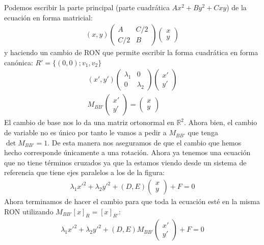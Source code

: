 \documentclass[14pt]{book}
\begin{document}
Podemos escribir la parte principal (parte cuadrática $Ax^2 + By^2 + Cxy$) de la ecuación en forma matricial:
\begin{align*}
	(x, y)\left(\begin{array}{cc}
	A & C/2 \\ C/2 &B
	\end{array}\right)\left(\begin{array}{c}
	x \\ y
	\end{array}\right)
\end{align*}
y haciendo un cambio de RON que permite escribir la forma cuadrática en forma canónica: $R' = \{(0,0); v_1, v_2\}$
\begin{align*}
	(x', y')\left(\begin{array}{cc}
	\lambda_1 & 0 \\ 0 & \lambda_2
	\end{array}\right)\left(\begin{array}{c}
	x' \\ y'
	\end{array}\right) \\
	M_{BB'}\left(\begin{array}{c}
	x' \\ y'
	\end{array}\right) = \left(\begin{array}{c}
	x \\ y
	\end{array}\right)
\end{align*}
El cambio de base nos lo da una matriz ortonormal en $\mathbb{R}^2$. Ahora bien, el cambio de variable no es único por tanto le vamos a pedir a $M_{BB'}$ que tenga $\det M_{BB'} = 1$. De esta manera nos aseguramos de que el cambio que hemos hecho corresponde únicamente a una rotación. Ahora ya tenemos una ecuación que no tiene términos cruzados ya que la estamos viendo desde un sistema de referencia que tiene ejes paralelos a los de la figura:
\begin{align*}
	\lambda_1 x'^2 + \lambda_2 y'^2 + (D, E)\left(\begin{array}{c}
	x \\ y
	\end{array}\right) + F = 0
\end{align*}
Ahora terminamos de hacer el cambio para que toda la ecuación esté en la misma RON utilizando $M_{BB'}[x]_R = [x]_{R'}$:
\begin{align*}
	\lambda_1 x'^2 + \lambda_2 y'^2 + (D, E)M_{BB'}\left(\begin{array}{c}
	x' \\ y'
	\end{array}\right) + F = 0
\end{align*}
\end{document}
